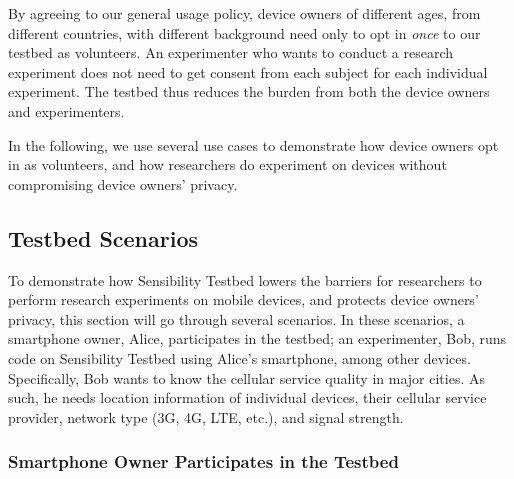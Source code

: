 By agreeing to our general usage policy, device 
owners of different ages, from different countries, with different
background need only to opt in \textit{once} to our testbed as 
volunteers. An experimenter who wants to conduct a research 
experiment 
does not need to get consent from each subject for each individual
experiment. The testbed thus reduces the burden from both the 
device owners and experimenters. 

In the following, we use several use cases to
demonstrate how device owners opt in as volunteers, and how
researchers do experiment on devices without compromising device
owners' privacy.

\subsection{Testbed Scenarios}\label{sec-scenario}

To demonstrate how Sensibility Testbed lowers the barriers for
researchers to perform research experiments on mobile devices,
and protects device owners' privacy, this section will go
through several scenarios. In these scenarios, a smartphone owner, Alice,
participates in the testbed; an experimenter, Bob, runs code on
Sensibility Testbed using Alice's smartphone, among other
devices. Specifically, Bob wants to know the cellular service
quality in major cities. As such, he needs location information
of individual devices, their cellular service provider, network
type (3G, 4G, LTE, etc.), and signal strength.

\subsubsection{Smartphone Owner Participates in the Testbed}
\label{sec-owner-participate}

